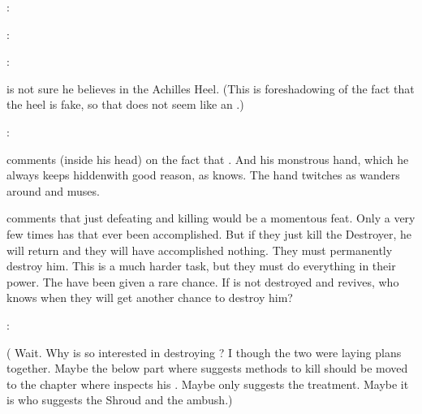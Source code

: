 \Azraid: 

\Teshrial: 

\Azraid: 

\Azraid{} is not sure he believes in the Achilles Heel. 
(This is foreshadowing of the fact that the heel is fake, so that does not seem like an .) 

\Azraid: 

\Teshrial{} comments (inside his head) on the fact that . 
And his monstrous hand, which he always keeps hidden\dash with good reason, as \Teshrial{} knows. 
The hand twitches as \Azraid wanders around and muses. 


\Azraid comments that just defeating and killing \Ishnaruchaefir would be a momentous feat.
Only a very few times has that ever been accomplished. 
But if they just kill the Destroyer, he will return and they will have accomplished nothing. 
They must permanently destroy him.
This is a much harder task, but they must do everything in their power. 
The \resphain have been given a rare chance.
If \Ishnaruchaefir is not destroyed and revives, who knows when they will get another chance to destroy him?

\Teshrial: 



\begin{comment}
  \subsection{Azraid gives suggestions}
\end{comment}

(%
  Wait. 
  Why is \Azraid so interested in destroying \Ishnaruchaefir? 
  I though the two were laying plans together.
  Maybe the below part where \Azraid suggests methods to kill \Ishnaruchaefir should be moved to the chapter where \Teshrial inspects his \noggyaleth.
  Maybe \Azraid only suggests the \neoresphan treatment.
  Maybe it is \Urizeth who suggests the Shroud and the \noggyal ambush.)

